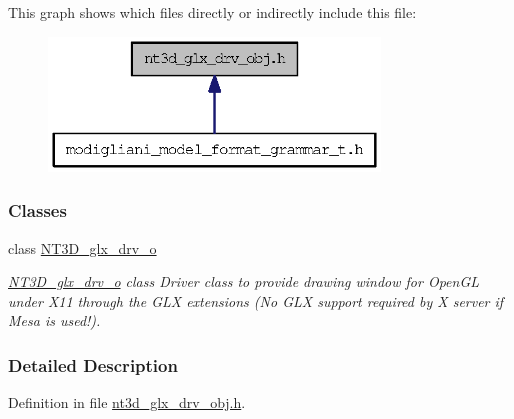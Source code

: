 This graph shows which files directly or indirectly include this file:
\nopagebreak
\begin{figure}[H]
\begin{center}
\leavevmode
\includegraphics[width=250pt]{nt3d__glx__drv__obj_8h__dep__incl}
\end{center}
\end{figure}
\subsubsection*{Classes}
\begin{DoxyCompactItemize}
\item 
class \hyperlink{class_n_t3_d__glx__drv__o}{NT3D\_\-glx\_\-drv\_\-o}
\begin{DoxyCompactList}\small\item\em \hyperlink{class_n_t3_d__glx__drv__o}{NT3D\_\-glx\_\-drv\_\-o} class Driver class to provide drawing window for OpenGL under X11 through the GLX extensions (No GLX support required by X server if Mesa is used!). \item\end{DoxyCompactList}\end{DoxyCompactItemize}


\subsubsection{Detailed Description}


Definition in file \hyperlink{nt3d__glx__drv__obj_8h_source}{nt3d\_\-glx\_\-drv\_\-obj.h}.

